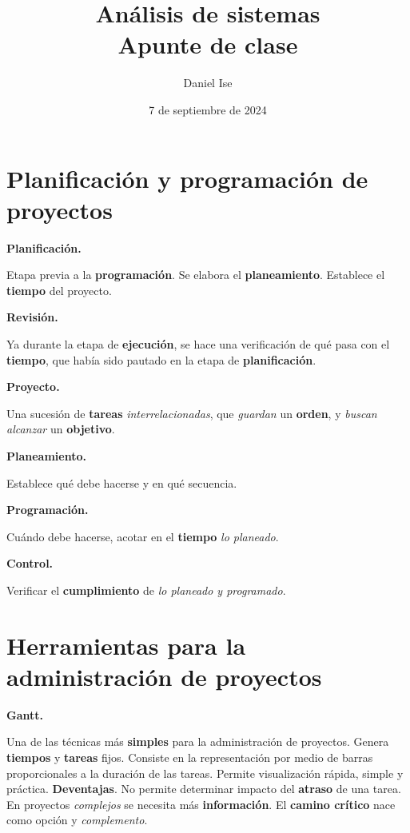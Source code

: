 \documentclass{article}
\title{Análisis de sistemas\\Apunte de clase}
\author{Daniel Ise}
\date{7 de septiembre de 2024}
\begin{document}
\maketitle

\tableofcontents

\section{Planificación y programación de proyectos}

\textbf{Planificación.}

Etapa previa a la \textbf{programación}.
Se elabora el \textbf{planeamiento}.
Establece el \textbf{tiempo} del proyecto.

\textbf{Revisión.}

Ya durante la etapa de \textbf{ejecución},
se hace una verificación de qué pasa con el \textbf{tiempo},
que había sido pautado en la etapa de \textbf{planificación}.

\textbf{Proyecto.}

Una sucesión de \textbf{tareas} \textit{interrelacionadas},
que \textit{guardan} un \textbf{orden},
y \textit{buscan alcanzar} un \textbf{objetivo}.

\textbf{Planeamiento.}

Establece qué debe hacerse y en qué secuencia.

\textbf{Programación.}

Cuándo debe hacerse,
acotar en el \textbf{tiempo} \textit{lo planeado}.

\textbf{Control.}

Verificar el \textbf{cumplimiento} de \textit{lo planeado y programado}.

\section{Herramientas para la administración de proyectos}

\textbf{Gantt.}

Una de las técnicas más \textbf{simples} para la administración de proyectos.
Genera \textbf{tiempos} y \textbf{tareas} fijos.
Consiste en la representación por medio de barras proporcionales  a la duración de las tareas.
Permite visualización rápida, simple y práctica.
\textbf{Deventajas}. 
No permite determinar impacto del \textbf{atraso} de una tarea.
En proyectos \textit{complejos} se necesita más \textbf{información}.
El \textbf{camino crítico} nace como opción y \textit{complemento}.
\end{document}
